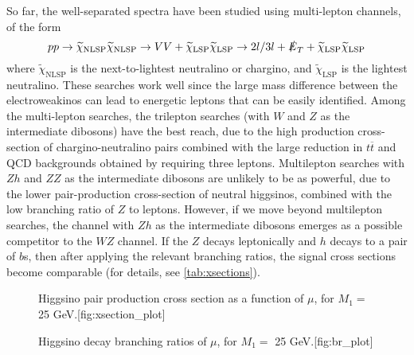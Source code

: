 So far, the well-separated spectra have been studied using multi-lepton channels, of the form 
\[pp\rightarrow \widetilde{\chi}_\text{NLSP}\widetilde{\chi}_\text{NLSP}\rightarrow VV + \widetilde{\chi}_\text{LSP}\widetilde{\chi}_\text{LSP}\rightarrow 2l/3l + \slashed{E}_T +  \widetilde{\chi}_\text{LSP}\widetilde{\chi}_\text{LSP}\]
where $\widetilde{\chi}_\text{NLSP}$ is the next-to-lightest neutralino or chargino, and $\widetilde{\chi}_\text{LSP}$ is the lightest neutralino. These searches work well since the large mass difference between the electroweakinos can lead to energetic leptons that can be easily identified. Among the multi-lepton searches, the trilepton searches (with $W$ and $Z$ as the intermediate dibosons) have the best reach, due to the high production cross-section of chargino-neutralino pairs combined with the large reduction in $t\overline{t}$ and QCD backgrounds obtained by requiring three leptons. Multilepton searches with $Zh$ and $ZZ$ as the intermediate dibosons are unlikely to be as powerful, due to the lower pair-production cross-section of neutral higgsinos, combined with the low branching ratio of $Z$ to leptons. However, if we move beyond multilepton searches, the channel with $Zh$ as the intermediate dibosons emerges as a possible competitor to the $WZ$ channel. If the $Z$ decays leptonically and $h$ decays to a pair of $b$s, then after applying the relevant branching ratios, the signal cross sections become comparable (for details, see \autoref{tab:xsections}). 
\begin{figure}
    \centering
    \begin{sidecaption}{Higgsino pair production cross section as a function of $\mu$, for $M_1=$ 25 GeV.}[fig:xsection_plot]

\end{sidecaption}
\end{figure}
\begin{figure}
    \centering
    \begin{sidecaption}{Higgsino decay branching ratios of $\mu$, for $M_1=$ 25 GeV.}[fig:br_plot]

\end{sidecaption}
\end{figure}

